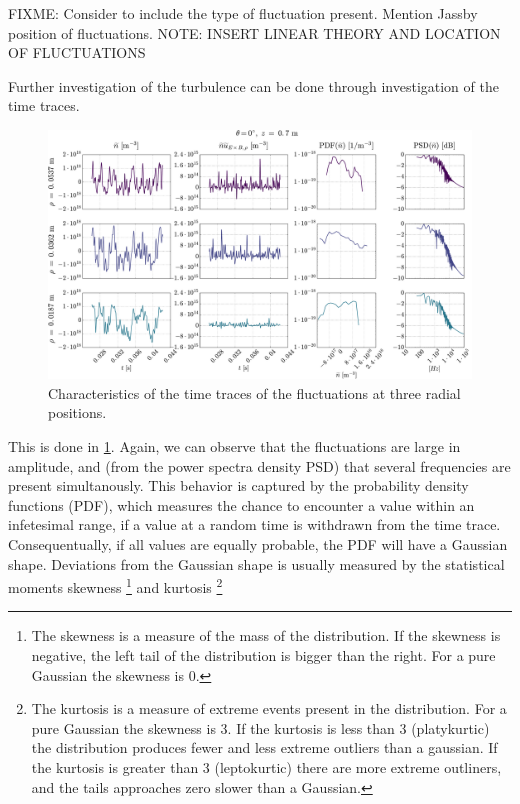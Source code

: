 FIXME: Consider to include the type of fluctuation present.
Mention Jassby position of fluctuations.
NOTE: INSERT LINEAR THEORY AND LOCATION OF FLUCTUATIONS


Further investigation of the turbulence can be done through investigation of the time traces.
%
\begin{figure}[htb]
    \centering
    \includegraphics[width=1.0\textwidth]{fig/results/combinedPlots/008T}
    \caption{Characteristics of the time traces of the fluctuations at three radial positions.}
    \label{fig:combinedPlots008}
\end{figure}
%
This is done in \cref{fig:combinedPlots008}.
Again, we can observe that the fluctuations are large in amplitude, and (from the power spectra density PSD) that several frequencies are present simultanously.
This behavior is captured by the probability density functions (PDF), which measures the chance to encounter a value within an infetesimal range, if a value at a random time is withdrawn from the time trace.
Consequentually, if all values are equally probable, the PDF will have a Gaussian shape.
Deviations from the Gaussian shape is usually measured by the statistical moments skewness%
%
\footnote{
    The skewness is a measure of the mass of the distribution.
    If the skewness is negative, the left tail of the distribution is bigger than the right.
    For a pure Gaussian the skewness is 0.
}
%
and kurtosis
%
\footnote{
    The kurtosis is a measure of extreme events present in the distribution.
    For a pure Gaussian the skewness is 3.
    If the kurtosis is less than 3 (platykurtic) the distribution produces fewer and less extreme outliers than a gaussian.
    If the kurtosis is greater than 3 (leptokurtic) there are more extreme outliners, and the tails approaches zero slower than a Gaussian.
}
%
